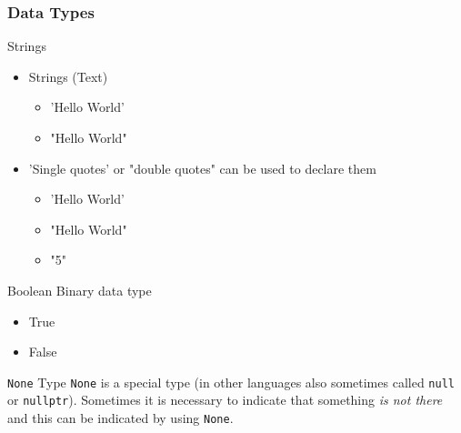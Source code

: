 \documentclass[10pt, a4paper]{beamer} %
\begin{document}
\begin{frame}[c, allowframebreaks]\frametitle{Data Types}
  \begin{block}{Strings}
    \begin{itemize}
      \item Strings (Text)
            \begin{itemize}
              \item {\color{blue}'Hello World'}
              \item {\color{red}"Hello World"}
            \end{itemize}
      \item {\color{blue} 'Single quotes'} or {\color{red} "double quotes"} can be used to declare them
            \begin{itemize}
              \item 'Hello World'
              \item "Hello World"
              \item "5"
            \end{itemize}
    \end{itemize}
  \end{block}
  \begin{block}{Boolean}
    Binary data type
    \begin{itemize}
      \item True
      \item False
    \end{itemize}
  \end{block}
  \framebreak
  \begin{block}{\texttt{None} Type}
    \texttt{None} is a special type (in other languages also sometimes called \texttt{null} or \texttt{nullptr}).
    Sometimes it is necessary to indicate that something \textit{is not there} and this can be indicated by using \texttt{None}.
  \end{block}


\end{frame}
\end{document}

